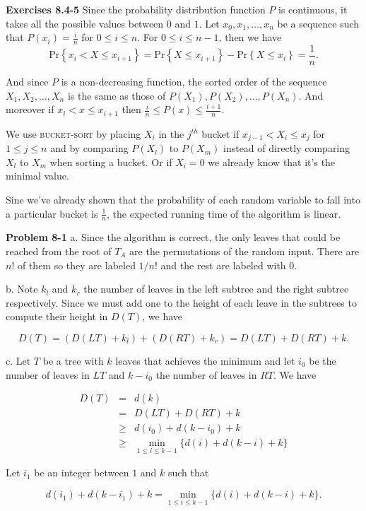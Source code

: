 \documentclass[a4paper,12pt]{article}
\newcommand{\newpar}[1]
{\bigskip \noindent \textbf{Exercises #1} \newline}
\newcommand{\newprob}[1]
{\bigskip \noindent \textbf{Problem #1} \newline}
\newcommand{\subpar}[1]{\medskip \noindent #1.}
\newcommand{\prob}[1]{\mathrm{Pr}\left\{ #1 \right\}}
\begin{document}
\newpar{8.4-5} Since the probability distribution function $P$ is
continuous, it takes all the possible values between $0$ and $1$.  Let
$x_0, x_1, \ldots, x_n$ be a sequence such that $P(x_i) = \frac{i}{n}$
for $0 \le i \le n$.  For $0 \le i \le n-1$, then we have
\[  \prob{ x_i < X \le x_{i+1}} = \prob{ X \le x_{i+1}} - \prob{ X \le
  x_i} = \frac{1}{n}.\]

And since $P$ is a non-decreasing function, the sorted order of the
sequence $X_1, X_2, \ldots, X_n$ is the same as those of $P(X_1), P(X_2),
\ldots, P(X_n)$.  And moreover if $x_i < x \le x_{i+1}$ then
$\frac{i}{n} \le P(x) \le \frac{i+1}{n}$.

We use \textsc{bucket-sort} by placing $X_i$ in the $j^{th}$ bucket if
$x_{j-1} < X_i \le x_j$ for $1\le j \le n$ and by comparing $P(X_l)$
to $P(X_m)$ instead of directly comparing $X_l$ to $X_m$ when sorting
a bucket.  Or if $X_i = 0$ we already know that it's the
minimal value.

Sine we've already shown that the probability of each random variable
to fall into a particular bucket is $\frac{1}{n}$, the expected
running time of the algorithm is linear.

\newprob{8-1} \subpar{a} Since the algorithm is correct, the only
leaves that could be reached from the root of $T_A$ are the
permutations of the random input.  There are $n!$ of them so they are
labeled $1/n!$ and the rest are labeled with $0$.

\subpar{b} Note $k_l$ and $k_r$ the number of leaves in the left
subtree and the right subtree respectively.  Since we must add one to
the height of each leave in the subtrees to compute their height in
$D(T)$, we have

\[ D(T) = (D(LT) + k_l) + (D(RT) + k_r) = D(LT) + D(RT) + k.\]

\subpar{c} Let $T$ be a tree with $k$ leaves that achieves the minimum
and let $i_0$ be the number of leaves in $LT$ and $k-i_0$ the number
of leaves in $RT$.  We have

\begin{eqnarray*}
  D(T) &=& d(k) \\
  &=& D(LT) + D(RT) + k \\
  &\ge& d(i_0) + d(k-i_0) + k \\
  &\ge& \min_{1\le i\le k-1}\{d(i) + d(k-i) +k\}
\end{eqnarray*}

Let $i_1$ be an integer between $1$ and $k$ such that

\[ d(i_1) + d(k-i_1) + k = \min_{1\le i\le k-1}\{d(i) + d(k-i) +k\}.\]
\end{document}
